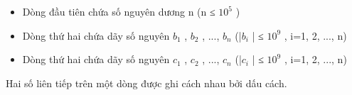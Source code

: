 \begin{itemize}
	\item Dòng đầu tiên chứa số nguyên dương n (n ≤ $10^{5}$ )
	\item Dòng thứ hai chứa dãy số nguyên $b_{1}$ , $b_{2}$ , ..., $b_{n}$ (|$b_{i}$ | ≤ $10^{9}$ , i=1, 2, ..., n)
	\item Dòng thứ hai chứa dãy số nguyên $c_{1}$ , $c_{2}$ , ..., $c_{n}$ (|$c_{i}$ | ≤ $10^{9}$ , i=1, 2, ..., n)
\end{itemize}

Hai số liên tiếp trên một dòng được ghi cách nhau bởi dấu cách.
